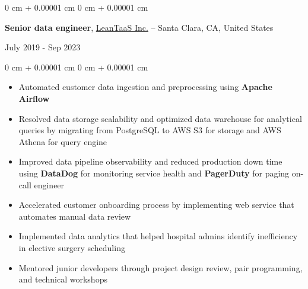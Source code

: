 \documentclass[10pt, letterpaper]{article}
\newenvironment{highlights}{
    \begin{itemize}[
        topsep=0.10 cm,
        parsep=0.10 cm,
        partopsep=0pt,
        itemsep=0pt,
        leftmargin=0 cm + 10pt
    ]
}{
    \end{itemize}
} %
\newenvironment{onecolentry}{
    \begin{adjustwidth}{
        0 cm + 0.00001 cm
    }{
        0 cm + 0.00001 cm
    }
}{
    \end{adjustwidth}
} %
\newenvironment{twocolentry}[2][]{
    \onecolentry
    \def\secondColumn{#2}
    \setcolumnwidth{\fill, 4.5 cm}
    \begin{paracol}{2}
}{
    \switchcolumn \raggedleft \secondColumn
    \end{paracol}
    \endonecolentry
} %
\begin{document}
        \begin{twocolentry}{
            July 2019 - Sep 2023
        }
            \textbf{Senior data engineer}, \href{https://www.leantaas.com}{LeanTaaS Inc.} -- Santa Clara, CA, United States
        \end{twocolentry}
        \vspace{0.10 cm}
        \begin{onecolentry}
            \begin{highlights}
                \item Automated customer data ingestion and preprocessing using \textbf{Apache Airflow}
                \item Resolved data storage scalability and optimized data warehouse for analytical queries by migrating from PostgreSQL to AWS S3 for storage and AWS Athena for query engine
                \item Improved data pipeline observability and reduced production down time using \textbf{DataDog} for monitoring service health and \textbf{PagerDuty} for paging on-call engineer
                \item Accelerated customer onboarding process by implementing web service that automates manual data review
                \item Implemented data analytics that helped hospital admins identify inefficiency in elective surgery scheduling
                \item Mentored junior developers through project design review, pair programming, and technical workshops
            \end{highlights}
        \end{onecolentry}
        \vspace{0.2 cm}

    

            
\end{document}
